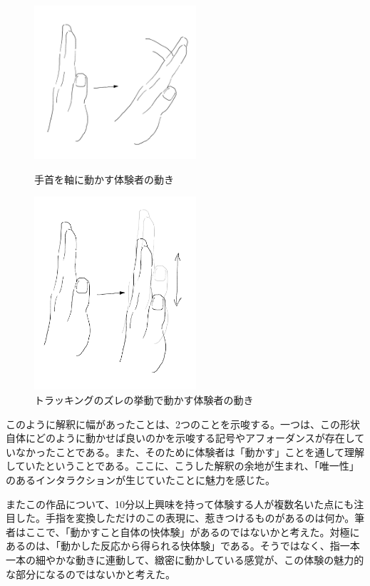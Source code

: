 \begin{figure}[htbp]
  \begin{minipage}[b]{0.5\linewidth}
    \centering
    \includegraphics[keepaspectratio, width=6cm]{img/movement0.jpg}
    \caption{手首を軸に動かす体験者の動き}
    \label{fig:movement_0}
  \end{minipage}
  \begin{minipage}[b]{0.5\linewidth}
    \centering
    \includegraphics[keepaspectratio, width=6cm]{img/movement1.jpg}
    \caption{トラッキングのズレの挙動で動かす体験者の動き}
    \label{fig:movement_1}
  \end{minipage}
\end{figure}

このように解釈に幅があったことは、2つのことを示唆する。一つは、この形状自体にどのように動かせば良いのかを示唆する記号やアフォーダンスが存在していなかったことである。また、そのために体験者は「動かす」ことを通して理解していたということである。ここに、こうした解釈の余地が生まれ、「唯一性」のあるインタラクションが生じていたことに魅力を感じた。

またこの作品について、10分以上興味を持って体験する人が複数名いた点にも注目した。手指を変換しただけのこの表現に、惹きつけるものがあるのは何か。筆者はここで、「動かすこと自体の快体験」があるのではないかと考えた。対極にあるのは、「動かした反応から得られる快体験」である。そうではなく、指一本一本の細やかな動きに連動して、緻密に動かしている感覚が、この体験の魅力的な部分になるのではないかと考えた。

